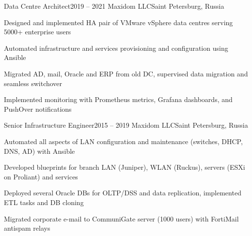 \expSubHeading
  {Data Centre Architect}{2019 -- 2021}
  {Maxidom LLC}{Saint Petersburg, Russia}
\begin{zitemize}
\item Designed and implemented HA pair of VMware vSphere data centres serving 5000+ enterprise users
\item Automated infrastructure and services provisioning and configuration using Ansible
\item Migrated AD, mail, Oracle and ERP from old DC, supervised data migration and seamless switchover
\item Implemented monitoring with Prometheus metrics, Grafana dashboards, and PushOver notifications
\end{zitemize}

\expSubHeading
  {Senior Infrastructure Engineer}{2015 -- 2019}
  {Maxidom LLC}{Saint Petersburg, Russia}
\begin{zitemize}
\item Automated all aspects of LAN configuration and maintenance (switches, DHCP, DNS, AD) with Ansible
\item Developed blueprints for branch LAN (Juniper), WLAN (Ruckus), servers (ESXi on Proliant) and services
\item Deployed several Oracle DBs for OLTP/DSS and data replication, implemented ETL tasks and DB cloning
\item Migrated corporate e-mail to CommuniGate server (1000 users) with FortiMail antispam relays
\end{zitemize}

